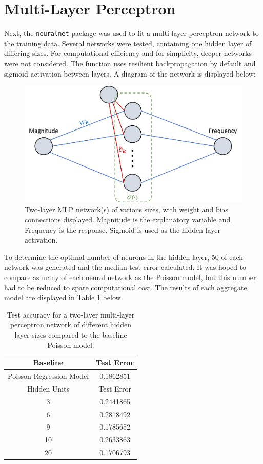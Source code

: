 
\section{Multi-Layer Perceptron}

Next, the \texttt{neuralnet} package \cite{neuralnet} was used to fit a multi-layer perceptron network to the training data.  Several networks were tested, containing one hidden layer of differing sizes.  For computational efficiency and for simplicity, deeper networks were not considered.  The function uses resilient backpropagation by default and sigmoid activation between layers.  A diagram of the network is displayed below:

\begin{figure}[H]
    \center
    \includegraphics[width=0.55\linewidth]{Figures/MLPdiag.png}
    \caption{\footnotesize{Two-layer MLP network(s) of various sizes, with weight and bias connections displayed.  Magnitude is the explanatory variable and Frequency is the response.  Sigmoid is used as the hidden layer activation.}}
    \label{tohoku_unfit}
\end{figure}

To determine the optimal number of neurons in the hidden layer, 50 of each network was generated and the median test error calculated.  It was hoped to compare as many of each neural network as the Poisson model, but this number had to be reduced to spare computational cost.  The results of each aggregate model are displayed in Table \ref{Table1} below.

\begin{table}[H]
\centering
\begin{tabular}{cc}
  \hline
 Baseline & Test Error \\ 
  \hline
  Poisson Regression Model & 0.1862851 \\ 
  \hline
 Hidden Units & Test Error \\ 
  \hline
3 & 0.2441865 \\ 
  6 & 0.2818492 \\ 
  9 & 0.1785652 \\ 
  10 & 0.2633863 \\ 
  20 & 0.1706793 \\ 
   \hline
\end{tabular}
   \caption{\footnotesize Test accuracy for a two-layer multi-layer perceptron network of different hidden layer sizes compared to the baseline Poisson model.}
   \label{Table1}
\end{table}


